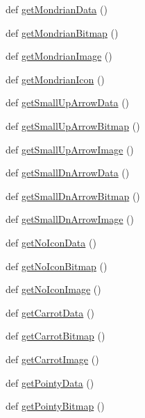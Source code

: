 \begin{DoxyCompactItemize}
\item 
def \hyperlink{namespaceimages_aecec2b84a11430cc4d1eac8aa019d74a}{get\+Mondrian\+Data} ()
\item 
def \hyperlink{namespaceimages_a3ae00d30a729f478de891d5d97fb7608}{get\+Mondrian\+Bitmap} ()
\item 
def \hyperlink{namespaceimages_a02fd56f1e295f6d744c8e3ce0a34fdb9}{get\+Mondrian\+Image} ()
\item 
def \hyperlink{namespaceimages_a95681a3eaa29e37a999d212c55b552f3}{get\+Mondrian\+Icon} ()
\item 
def \hyperlink{namespaceimages_a2522e9e21e8cfb2a4f7473e90710926a}{get\+Small\+Up\+Arrow\+Data} ()
\item 
def \hyperlink{namespaceimages_adb1d05ff2a2ba4e149e4251039682631}{get\+Small\+Up\+Arrow\+Bitmap} ()
\item 
def \hyperlink{namespaceimages_a54f4855e6e5fab39abeede5398a86eb0}{get\+Small\+Up\+Arrow\+Image} ()
\item 
def \hyperlink{namespaceimages_a091ab95dfeb4f06de7c2eb0bab3a6278}{get\+Small\+Dn\+Arrow\+Data} ()
\item 
def \hyperlink{namespaceimages_a5aa232215269c0c30d855391625bfd12}{get\+Small\+Dn\+Arrow\+Bitmap} ()
\item 
def \hyperlink{namespaceimages_abf96ea60e0ea4e77a1f9a76391236a32}{get\+Small\+Dn\+Arrow\+Image} ()
\item 
def \hyperlink{namespaceimages_a7b9770da476a15556498ad493df6abb4}{get\+No\+Icon\+Data} ()
\item 
def \hyperlink{namespaceimages_a442970b306ddb75c881a7d99eacfd7ed}{get\+No\+Icon\+Bitmap} ()
\item 
def \hyperlink{namespaceimages_ade43d1cef58e60dc22e5fe7728b200e6}{get\+No\+Icon\+Image} ()
\item 
def \hyperlink{namespaceimages_a0c5ea40e98df45c2f313e28639a2b321}{get\+Carrot\+Data} ()
\item 
def \hyperlink{namespaceimages_a1f0f3db4c047cc2a3a3f1de039b9cbd2}{get\+Carrot\+Bitmap} ()
\item 
def \hyperlink{namespaceimages_ac43eb979d7c688296c5da9ff3d0ae5bc}{get\+Carrot\+Image} ()
\item 
def \hyperlink{namespaceimages_a79b62e36e634b9e6d8a72ea625ebc585}{get\+Pointy\+Data} ()
\item 
def \hyperlink{namespaceimages_a827147fb0444cc320cf9ad0b7ea76d68}{get\+Pointy\+Bitmap} ()
\item 

\end{DoxyCompactItemize}
